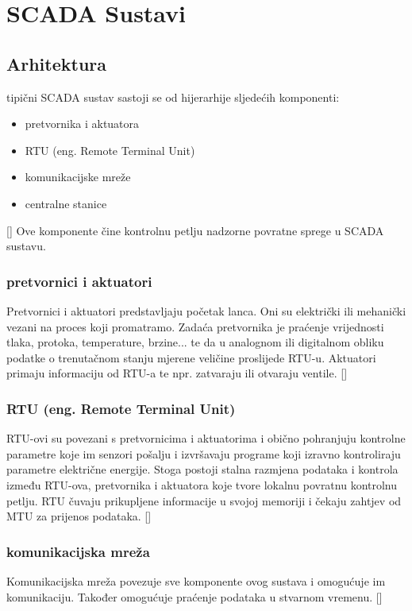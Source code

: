 \documentclass[times, utf8, zavrsni]{fer}
\begin{document}
\section{SCADA Sustavi}

\subsection{Arhitektura}
tipični SCADA sustav sastoji se od hijerarhije sljedećih komponenti:
\begin{itemize}
\item{pretvornika i aktuatora}
\item{RTU (eng. Remote Terminal Unit)}
\item{komunikacijske mreže}
\item{centralne stanice}
\end{itemize} [\cite{scada-arh}]
Ove komponente čine kontrolnu petlju nadzorne povratne sprege u SCADA sustavu.

\subsubsection{pretvornici i aktuatori}
Pretvornici i aktuatori predstavljaju početak lanca. Oni su električki ili mehanički vezani na proces koji promatramo. Zadaća pretvornika je praćenje vrijednosti tlaka, protoka, temperature, brzine... te da u analognom ili digitalnom obliku podatke o trenutačnom stanju mjerene veličine proslijede RTU-u. Aktuatori primaju informaciju od RTU-a te npr. zatvaraju ili otvaraju ventile.
[\cite{scada-thesis}]

\subsubsection{RTU (eng. Remote Terminal Unit)}
RTU-ovi su povezani s pretvornicima i aktuatorima i obično pohranjuju kontrolne parametre koje im senzori pošalju i izvršavaju programe koji izravno kontroliraju parametre električne energije. Stoga postoji stalna razmjena podataka i kontrola između RTU-ova, pretvornika i aktuatora koje tvore lokalnu povratnu kontrolnu petlju. RTU čuvaju prikupljene informacije u svojoj memoriji i čekaju zahtjev od MTU za prijenos podataka.
[\cite{scada-thesis}]

\subsubsection{komunikacijska mreža}
Komunikacijska mreža povezuje sve komponente ovog sustava i omogućuje im komunikaciju. Također omogućuje praćenje podataka u stvarnom vremenu.
[\cite{scada-thesis}]
\end{document}
